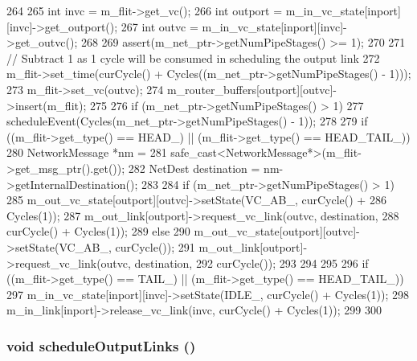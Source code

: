 \begin{DoxyCode}
264 {
265     int invc = m_flit->get_vc();
266     int outport = m_in_vc_state[inport][invc]->get_outport();
267     int outvc = m_in_vc_state[inport][invc]->get_outvc();
268 
269     assert(m_net_ptr->getNumPipeStages() >= 1);
270 
271     // Subtract 1 as 1 cycle will be consumed in scheduling the output link
272     m_flit->set_time(curCycle() + Cycles((m_net_ptr->getNumPipeStages() - 1)));
273     m_flit->set_vc(outvc);
274     m_router_buffers[outport][outvc]->insert(m_flit);
275 
276     if (m_net_ptr->getNumPipeStages() > 1)
277         scheduleEvent(Cycles(m_net_ptr->getNumPipeStages() - 1));
278 
279     if ((m_flit->get_type() == HEAD_) || (m_flit->get_type() == HEAD_TAIL_)) {
280         NetworkMessage *nm =
281             safe_cast<NetworkMessage*>(m_flit->get_msg_ptr().get());
282         NetDest destination = nm->getInternalDestination();
283 
284         if (m_net_ptr->getNumPipeStages() > 1) {
285             m_out_vc_state[outport][outvc]->setState(VC_AB_, curCycle() +
286                                                      Cycles(1));
287             m_out_link[outport]->request_vc_link(outvc, destination,
288                                                  curCycle() + Cycles(1));
289         } else {
290             m_out_vc_state[outport][outvc]->setState(VC_AB_, curCycle());
291             m_out_link[outport]->request_vc_link(outvc, destination,
292                 curCycle());
293         }
294     }
295 
296     if ((m_flit->get_type() == TAIL_) || (m_flit->get_type() == HEAD_TAIL_)) {
297         m_in_vc_state[inport][invc]->setState(IDLE_, curCycle() + Cycles(1));
298         m_in_link[inport]->release_vc_link(invc, curCycle() + Cycles(1));
299     }
300 }
\end{DoxyCode}
\hypertarget{classRouter_a4a8dc105bd8d06865d65c708e3e21188}{
\subsubsection[{scheduleOutputLinks}]{\setlength{\rightskip}{0pt plus 5cm}void scheduleOutputLinks ()}}
\label{classRouter_a4a8dc105bd8d06865d65c708e3e21188}



